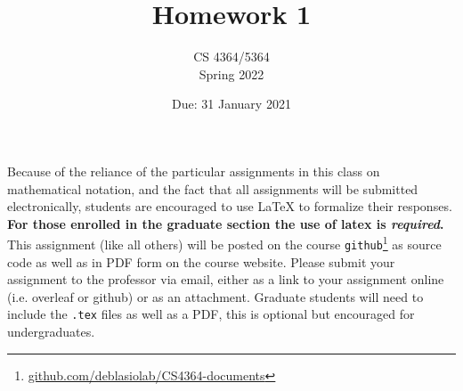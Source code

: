 \documentclass[11pt, oneside]{article}   	%
\title{Homework 1}
\author{CS 4364/5364\\Spring 2022}
\date{Due: 31 January 2021}							%
\begin{document}
\maketitle

Because of the reliance of the particular assignments in this class on mathematical notation, 
and the fact that all assignments will be submitted electronically, 
students are encouraged to use \LaTeX{} to formalize their responses. 
\textbf{For those enrolled in the graduate section the use of latex is \emph{required}.}
This assignment (like all others) will be posted on the course \texttt{github}\footnote{\url{github.com/deblasiolab/CS4364-documents}} as source code as well as in PDF form on the course website. 
Please submit your assignment to the professor via email, either as a link to your assignment online (i.e. overleaf or github) or as an attachment. 
Graduate students will need to include the \texttt{.tex} files as well as a PDF, this is optional but encouraged for undergraduates. 
\end{document}
